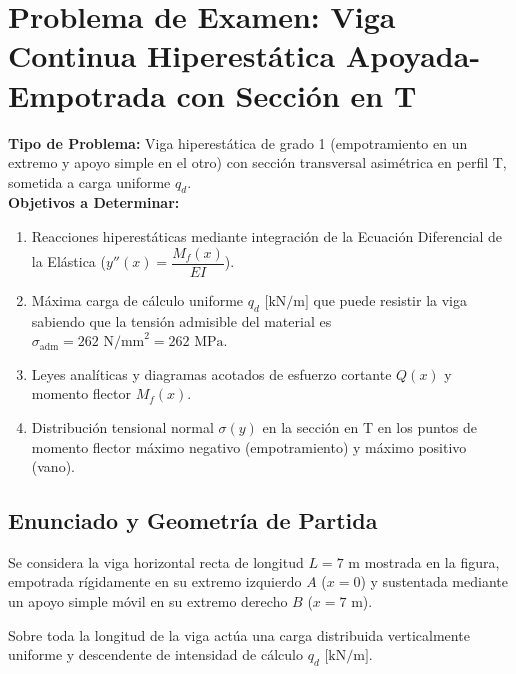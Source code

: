 \section{Problema de Examen: Viga Continua Hiperestática Apoyada-Empotrada con Sección en T}

\begin{tcolorbox}[colback=white, colframe=myb!80!black, arc=4pt, boxrule=0.9pt, left=8pt, right=8pt, top=7pt, bottom=7pt]
    \textbf{Tipo de Problema:} Viga hiperestática de grado 1 (empotramiento en un extremo y apoyo simple en el otro) con sección transversal asimétrica en perfil T, sometida a carga uniforme $q_d$.\\
    \textbf{Objetivos a Determinar:}
    \begin{enumerate}
        \item Reacciones hiperestáticas mediante integración de la Ecuación Diferencial de la Elástica ($y''(x) = \dfrac{M_f(x)}{EI}$).
        \item Máxima carga de cálculo uniforme $q_d\text{ [kN/m]}$ que puede resistir la viga sabiendo que la tensión admisible del material es $\sigma_{\text{adm}} = 262\text{ N/mm}^2 = 262\text{ MPa}$.
        \item Leyes analíticas y diagramas acotados de esfuerzo cortante $Q(x)$ y momento flector $M_f(x)$.
        \item Distribución tensional normal $\sigma(y)$ en la sección en T en los puntos de momento flector máximo negativo (empotramiento) y máximo positivo (vano).
    \end{enumerate}
\end{tcolorbox}

\subsection{Enunciado y Geometría de Partida}

Se considera la viga horizontal recta de longitud $L = 7\text{ m}$ mostrada en la figura, empotrada rígidamente en su extremo izquierdo $A$ ($x = 0$) y sustentada mediante un apoyo simple móvil en su extremo derecho $B$ ($x = 7\text{ m}$). 

Sobre toda la longitud de la viga actúa una carga distribuida verticalmente uniforme y descendente de intensidad de cálculo $q_d\text{ [kN/m]}$.

